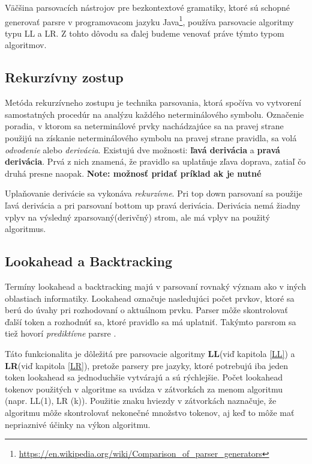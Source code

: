 Väčšina parsovacích nástrojov pre bezkontextové gramatiky, ktoré sú schopné generovať parsre v programovacom jazyku Java\footnote{\url{https://en.wikipedia.org/wiki/Comparison_of_parser_generators}}, používa parsovacie algoritmy typu LL a LR. Z tohto dôvodu sa ďalej budeme venovať práve týmto typom algoritmov.

\subsection{Rekurzívny zostup}\label{recursive-descent}
Metóda rekurzívneho zostupu je technika parsovania, ktorá spočíva vo vytvorení samostatných procedúr na analýzu každého neterminálového symbolu. \cite{CVUT:program_language} Označenie poradia, v ktorom sa neterminálové prvky nachádzajúce sa na pravej strane použijú na získanie neterminálového symbolu na pravej strane pravidla, sa volá \textit{odvodenie} alebo \textit{derivácia}. Existujú dve možnosti: \textbf{ľavá derivácia} a \textbf{pravá derivácia}. Prvá z nich znamená, že pravidlo sa uplatňuje zľava doprava, zatiaľ čo druhá presne naopak. 
\textbf{Note: možnosť pridať príklad ak je nutné}

Uplaňovanie derivácie sa vykonáva \textit{rekurzívne}. Pri top down parsovaní sa použije ľavá derivácia a pri parsovaní bottom up pravá derivácia. Derivácia nemá žiadny vplyv na výsledný zparsovaný(derivčný) strom, ale má vplyv na použitý algoritmus.

\subsection{Lookahead a Backtracking}
Termíny lookahead a backtracking majú v parsovaní rovnaký význam ako v iných oblastiach informatiky. Lookahead označuje nasledujúci počet prvkov, ktoré sa berú do úvahy pri rozhodovaní o aktuálnom prvku. Parser môže skontrolovať ďalší token a rozhodnúť sa, ktoré pravidlo sa má uplatniť. Takýmto parsrom sa tiež hovorí \textit{prediktívne} parsre \cite{haberman:parsing_demystified}.

Táto funkcionalita je dôležitá pre parsovacie algoritmy \textbf{LL}(viď kapitola \ref{LL}) a \textbf{LR}(viď kapitola \ref{LR}), pretože parsery pre jazyky, ktoré potrebujú iba jeden token lookahead sa jednoduchšie vytvárajú a sú rýchlejšie. Počet lookahead tokenov použitých v algoritme sa uvádza v zátvorkách za menom algoritmu (napr. LL(1), LR (k)). Použitie znaku hviezdy v zátvorkách naznačuje, že algoritmu môže skontrolovať nekonečné množstvo tokenov, aj keď to môže mať nepriaznivé účinky na výkon algoritmu.\cite{tomassetti:parsing}

